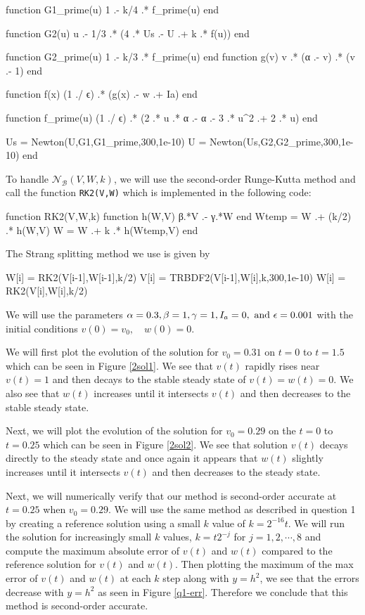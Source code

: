 \documentclass[12pt]{report}
\begin{document}
\begin{solution}
\begin{jllisting}
    function G1_prime(u)
        1 .- k/4 .* f_prime(u)
    end
    
    function G2(u)
        u .- 1/3 .* (4 .* Us .- U .+ k .* f(u))
    end
    
    function G2_prime(u)
        1 .- k/3 .* f_prime(u)
    end
    function g(v)
        v .* (α .- v) .* (v .- 1)
    end
    
    function f(x)
        (1 ./ ϵ) .* (g(x) .- w .+ Ia)
    end
    
    function f_prime(u)
        (1 ./ ϵ) .* (2 .* u .* α .- α .- 3 .* u^2 .+ 2 .* u)
    end
    
    Us = Newton(U,G1,G1_prime,300,1e-10)
    U = Newton(Us,G2,G2_prime,300,1e-10)
end
    \end{jllisting}
    To handle $\mathcal N_{\mathcal B}(V,W,k)$, we will use the second-order Runge-Kutta method and call the function \verb+RK2(V,W)+ which is implemented in the following code: 
    \begin{jllisting}
function RK2(V,W,k)
    function h(W,V)
        β.*V .- γ.*W
    end
    Wtemp = W .+ (k/2) .* h(W,V)
    W = W .+ k .* h(Wtemp,V)
end
    \end{jllisting}
    The Strang splitting method we use is given by
    \begin{jllisting}
W[i] = RK2(V[i-1],W[i-1],k/2)
V[i] = TRBDF2(V[i-1],W[i],k,300,1e-10)
W[i] = RK2(V[i],W[i],k/2)
    \end{jllisting}
    We will use the parameters $\alpha = 0.3, \beta = 1, \gamma = 1, I_a = 0, {~\text{and}~} \epsilon = 0.001$ with the initial conditions $v(0) = v_0, \quad w(0) = 0.$ 

    \noindent
    We will first plot the evolution of the solution for $v_0 =0.31$ on $t=0$ to $t=1.5$ which can be seen in Figure \ref{2sol1}. We see that $v(t)$ rapidly rises near $v(t)=1$ and then decays to the stable steady state of $v(t) = w(t) = 0$. We also see that $w(t)$ increases until it intersects $v(t)$ and then decreases to the stable steady state. 
    
    \noindent
    Next, we will plot the evolution of the solution for $v_0 = 0.29$ on the $t=0$ to $t=0.25$ which can be seen in Figure \ref{2sol2}. We see that solution $v(t)$ decays directly to the steady state and once again it appears that $w(t)$ slightly increases until it intersects $v(t)$ and then decreases to the steady state.  

    \noindent
    Next, we will numerically verify that our method is second-order accurate at $t=0.25$ when $v_0 = 0.29$. We will use the same method as 
    described in question 1 by creating a reference solution using a small $k$ value of $k=2^{-16}t$. We will run the solution for increasingly small $k$ values, $k=t2^{-j}$ for $j=1,2,\cdots,8$ and compute the maximum absolute error of $v(t)$ and $w(t)$ compared to the reference solution for $v(t)$ and $w(t)$. Then plotting the maximum of the max error of $v(t)$ and $w(t)$ at each $k$ step along with $y=h^2$, we see that the errors decrease with $y=h^2$ as seen in Figure \ref{q1-err}. Therefore we conclude that this method is second-order accurate.


\end{solution}
\end{document}

